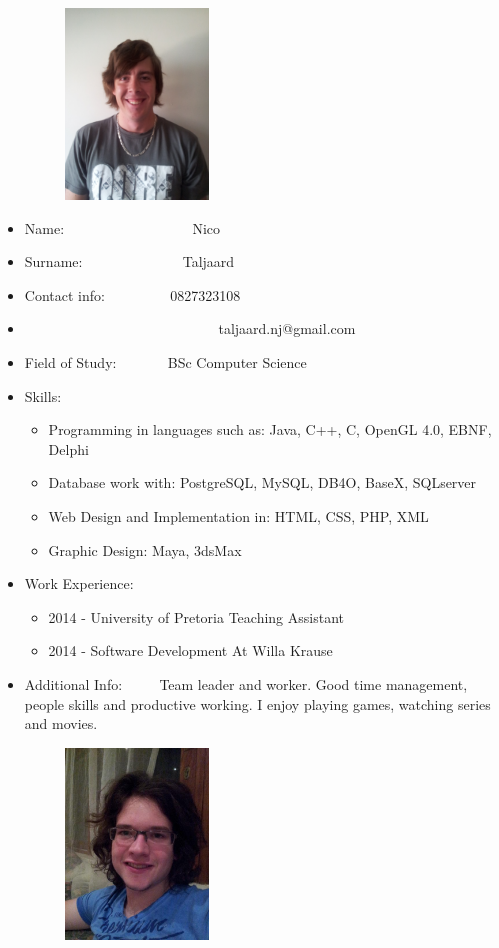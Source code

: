\documentclass[12pt]{article}
\begin{document}
\newpage
\begin{figure}[ht!]
	\centering
	\includegraphics[width=2in, height=2in]{./Pictures/NicoTaljaard.jpg}
\end{figure}

\begin{itemize}
	\item Name: \ ~~~~~~~~~~~~~~~ \ Nico
	\item Surname: \ ~~~~~~~~~~~ \ Taljaard
	\item Contact info: \ ~~~~~~ \ 0827323108 
	\item \ ~~~~~~~~~~~~~~~~~~~~~~~~~ \ taljaard.nj@gmail.com
	\item Field of Study: \ ~~~~ \ BSc Computer Science
	\item Skills: \begin{itemize}
					\item Programming in languages such as: Java, C++, C, OpenGL 4.0, EBNF, Delphi
					\item Database work with: PostgreSQL, MySQL, DB4O, BaseX, SQLserver
					\item Web Design and Implementation in: HTML, CSS, PHP, XML
					\item Graphic Design: Maya, 3dsMax
				  \end{itemize}
	\item Work Experience: \begin{itemize}
								\item 2014 - University of Pretoria Teaching Assistant
								\item 2014 - Software Development At Willa Krause
							\end{itemize}
	\item Additional Info: \ ~~ \ Team leader and worker. Good time management, people skills and productive working. I enjoy playing games, watching series and movies.	
\end{itemize}

\newpage
\begin{figure}[ht!]
\centering
\includegraphics[width=2in, height=2in]{./Pictures/MathysEllis.jpg}
\end{figure}
\end{document}
